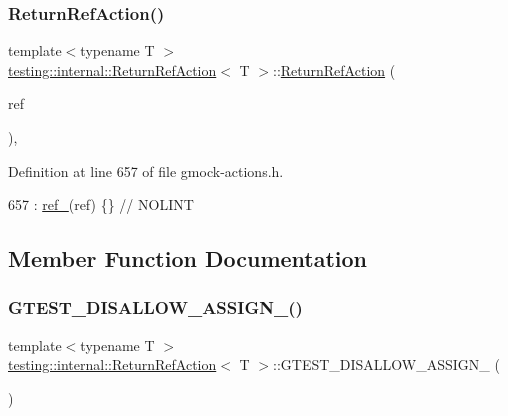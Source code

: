 \subsubsection{\texorpdfstring{Return\+Ref\+Action()}{ReturnRefAction()}}
{\footnotesize\ttfamily template$<$typename T $>$ \\
\hyperlink{classtesting_1_1internal_1_1ReturnRefAction}{testing\+::internal\+::\+Return\+Ref\+Action}$<$ T $>$\+::\hyperlink{classtesting_1_1internal_1_1ReturnRefAction}{Return\+Ref\+Action} (\begin{DoxyParamCaption}\item[{T \&}]{ref }\end{DoxyParamCaption})\hspace{0.3cm}{\ttfamily [inline]}, {\ttfamily [explicit]}}



Definition at line 657 of file gmock-\/actions.\+h.


\begin{DoxyCode}
657 : \hyperlink{classtesting_1_1internal_1_1ReturnRefAction_ad63d08b72518c2059e0cc99c006cd620}{ref\_}(ref) \{\}  \textcolor{comment}{// NOLINT}
\end{DoxyCode}


\subsection{Member Function Documentation}
\mbox{\label{classtesting_1_1internal_1_1ReturnRefAction_a7b26c9c4e02cdf2b82f76f32f8b8e053}} 
\subsubsection{\texorpdfstring{G\+T\+E\+S\+T\+\_\+\+D\+I\+S\+A\+L\+L\+O\+W\+\_\+\+A\+S\+S\+I\+G\+N\+\_\+()}{GTEST\_DISALLOW\_ASSIGN\_()}}
{\footnotesize\ttfamily template$<$typename T $>$ \\
\hyperlink{classtesting_1_1internal_1_1ReturnRefAction}{testing\+::internal\+::\+Return\+Ref\+Action}$<$ T $>$\+::G\+T\+E\+S\+T\+\_\+\+D\+I\+S\+A\+L\+L\+O\+W\+\_\+\+A\+S\+S\+I\+G\+N\+\_\+ (\begin{DoxyParamCaption}\item[{\hyperlink{classtesting_1_1internal_1_1ReturnRefAction}{Return\+Ref\+Action}$<$ T $>$}]{ }\end{DoxyParamCaption})\hspace{0.3cm}{\ttfamily [private]}}

